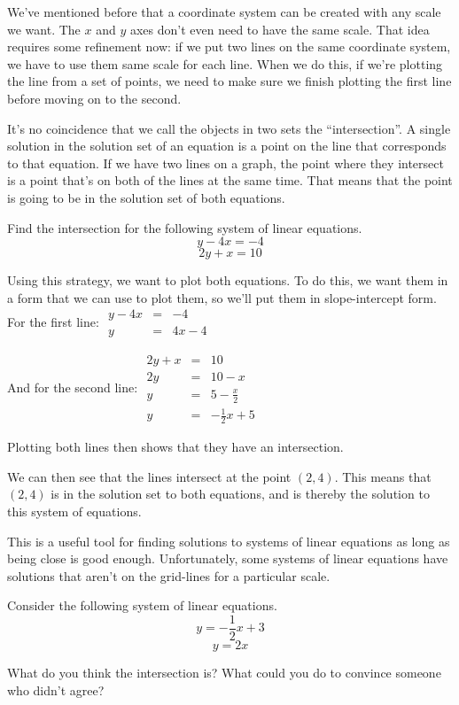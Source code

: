 We've mentioned before that a coordinate system can be created with any scale we want.  The $x$ and $y$ axes don't even need to have the same scale.  That idea requires some refinement now: if we put two lines on the same coordinate system, we have to use them same scale for each line.  When we do this, if we're plotting the line from a set of points, we need to make sure we finish plotting the first line before moving on to the second.


It's no coincidence that we call the objects in two sets the ``intersection''.  A single solution in the solution set of an equation is a point on the line that corresponds to that equation.  If we have two lines on a graph, the point where they intersect is a point that's on both of the lines at the same time.  That means that the point is going to be in the solution set of both equations.

\begin{example}
Find the intersection for the following system of linear equations.
$$y - 4x = -4$$
$$2y + x = 10$$

Using this strategy, we want to plot both equations.  To do this, we want them in a form that we can use to plot them, so we'll put them in slope-intercept form.
For the first line:
$\begin{array}{rcl}
y - 4x & = & -4 \\
y & = & 4x - 4 \end{array}$

And for the second line:
$\begin{array}{rcl}
2y + x & = & 10 \\
2y & = & 10 - x \\ 
y & = & 5 - \frac{x}{2} \\
y & = & - \frac{1}{2} x + 5 \end{array}$

Plotting both lines then shows that they have an intersection.

We can then see that the lines intersect at the point $(2,4)$.  This means that $(2,4)$ is in the solution set to both equations, and is thereby the solution to this system of equations.
\end{example}

This is a useful tool for finding solutions to systems of linear equations as long as being close is good enough.  Unfortunately, some systems of linear equations have solutions that aren't on the grid-lines for a particular scale.

\begin{prblm}
Consider the following system of linear equations.
$$y = -\frac{1}{2}x + 3$$
$$y = 2x$$

What do you think the intersection is?  What could you do to convince someone who didn't agree?
\end{prblm}
